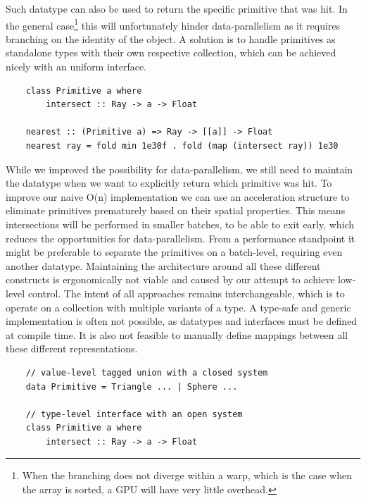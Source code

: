 \documentclass{article}
\newcommand{\type}[1]{\smash{\colorbox{codegray}{\texttt{#1}}}}
\begin{document}
Such datatype can also be used to return the specific primitive that was hit. 
In the general case\footnote{When the branching does not diverge within a warp, which is the case when the array is sorted, a GPU will have very little overhead.} this will unfortunately hinder data-parallelism as it requires branching on the identity of the object.
A solution is to handle primitives as standalone types with their own respective collection, which can be achieved nicely with an uniform interface.

\begin{verbatim}
    class Primitive a where
        intersect :: Ray -> a -> Float

    nearest :: (Primitive a) => Ray -> [[a]] -> Float
    nearest ray = fold min 1e30f . fold (map (intersect ray)) 1e30
\end{verbatim}

\newpage

While we improved the possibility for data-parallelism, we still need to maintain the \type{Primitive} datatype when we want to explicitly return which primitive was hit.
To improve our naive O(n) implementation we can use an acceleration structure to eliminate primitives prematurely based on their spatial properties.
This means intersections will be performed in smaller batches, to be able to exit early, which reduces the opportunities for data-parallelism.
From a performance standpoint it might be preferable to separate the primitives on a batch-level, requiring even another datatype.
Maintaining the architecture around all these different constructs is ergonomically not viable and caused by our attempt to achieve low-level control.  
The intent of all approaches remains interchangeable, which is to operate on a collection with multiple variants of a type.
A type-safe and generic implementation is often not possible, as datatypes and interfaces must be defined at compile time.
It is also not feasible to manually define mappings between all these different representations.

\begin{verbatim}
    // value-level tagged union with a closed system 
    data Primitive = Triangle ... | Sphere ...

    // type-level interface with an open system
    class Primitive a where
        intersect :: Ray -> a -> Float
\end{verbatim}
\end{document}
